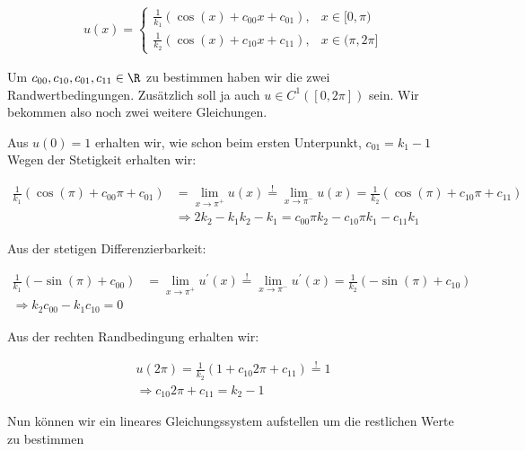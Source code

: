 \begin{solution}
\begin{itemize}
    \begin{align*}
      u(x)
      =
      \begin{cases}
        \frac{1}{k_1}(\cos(x) + c_{00}x + c_{01}), & x \in [0,\pi) \\
        \frac{1}{k_2}(\cos(x) + c_{10}x + c_{11}), & x \in (\pi, 2\pi]
      \end{cases}
    \end{align*}

    Um $c_{00}, c_{10}, c_{01}, c_{11} \in \R$ zu bestimmen haben wir die zwei
    Randwertbedingungen. Zusätzlich soll ja auch $u \in C^1([0,2\pi])$ sein. Wir
    bekommen also noch zwei weitere Gleichungen.

    Aus $u(0)= 1$ erhalten wir, wie schon beim ersten Unterpunkt, $c_{01} = k_1-1$
    Wegen der Stetigkeit erhalten wir:

    \begin{align*}
      \frac{1}{k_1}(\cos(\pi) + c_{00}\pi + c_{01})
      &=
      \lim_{x \rightarrow \pi^+} u(x)
      \stackrel{!}{=}
      \lim_{x \rightarrow \pi^-} u(x)
      =
      \frac{1}{k_2}(\cos(\pi)+ c_{10}\pi + c_{11}) \\
      &\Rightarrow
      2k_2 -k_1 k_2 -k_1 = c_{00}\pi k_2 - c_{10}\pi k_1 - c_{11} k_1
    \end{align*}

    Aus der stetigen Differenzierbarkeit:

    \begin{align*}
        \frac{1}{k_1}(-\sin(\pi) + c_{00})
        &=
        \lim_{x \rightarrow \pi^+} u^\prime(x)
        \stackrel{!}{=}
        \lim_{x \rightarrow \pi^-} u^\prime(x)
        =
        \frac{1}{k_2}(-\sin(\pi)+ c_{10}) \\
        \Rightarrow
        k_2 c_{00}- k_1 c_{10} = 0
    \end{align*}

    Aus der rechten Randbedingung erhalten wir:

    \begin{align*}
      u(2\pi)
      =
      \frac{1}{k_2}(1 + c_{10}2\pi + c_{11})
      \stackrel{!}{=}
      1 \\
      \Rightarrow
      c_{10}2\pi +c_{11} = k_2 - 1
    \end{align*}

    Nun können wir ein lineares Gleichungssystem aufstellen um die restlichen
    Werte zu bestimmen


\end{itemize}
\end{solution}
